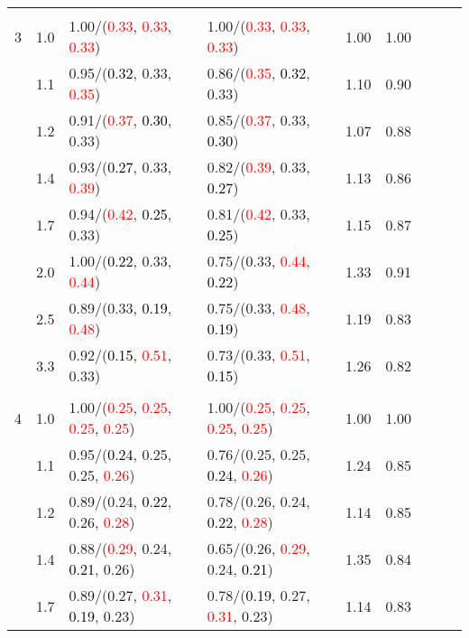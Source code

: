 \documentclass[10pt,a4paper]{report}
\begin{document}
\begin{table}[!htbp]
\begin{center}
{\begin{tabular}{ccllccccc}
			&&&&\\
			3			&1.0&1.00/(\textcolor{red}{0.33}, \textcolor{red}{0.33}, \textcolor{red}{0.33})&1.00/(\textcolor{red}{0.33}, \textcolor{red}{0.33}, \textcolor{red}{0.33})&1.00&1.00\\
			&1.1&0.95/(\textcolor{black}{0.32}, 0.33, \textcolor{red}{0.35})&0.86/(\textcolor{red}{0.35}, \textcolor{black}{0.32}, 0.33)&1.10&0.90\\
			&1.2&0.91/(\textcolor{red}{0.37}, \textcolor{black}{0.30}, 0.33)&0.85/(\textcolor{red}{0.37}, 0.33, \textcolor{black}{0.30})&1.07&0.88\\
			&1.4&0.93/(\textcolor{black}{0.27}, 0.33, \textcolor{red}{0.39})&0.82/(\textcolor{red}{0.39}, 0.33, \textcolor{black}{0.27})&1.13&0.86\\
			&1.7&0.94/(\textcolor{red}{0.42}, \textcolor{black}{0.25}, 0.33)&0.81/(\textcolor{red}{0.42}, 0.33, \textcolor{black}{0.25})&1.15&0.87\\
			&2.0&1.00/(\textcolor{black}{0.22}, 0.33, \textcolor{red}{0.44})&0.75/(0.33, \textcolor{red}{0.44}, \textcolor{black}{0.22})&1.33&0.91\\
			&2.5&0.89/(0.33, \textcolor{black}{0.19}, \textcolor{red}{0.48})&0.75/(0.33, \textcolor{red}{0.48}, \textcolor{black}{0.19})&1.19&0.83\\
			&3.3&0.92/(\textcolor{black}{0.15}, \textcolor{red}{0.51}, 0.33)&0.73/(0.33, \textcolor{red}{0.51}, \textcolor{black}{0.15})&1.26&0.82\\
			&&&&\\
			4			&1.0&1.00/(\textcolor{red}{0.25}, \textcolor{red}{0.25}, \textcolor{red}{0.25}, \textcolor{red}{0.25})&1.00/(\textcolor{red}{0.25}, \textcolor{red}{0.25}, \textcolor{red}{0.25}, \textcolor{red}{0.25})&1.00&1.00\\
			&1.1&0.95/(\textcolor{black}{0.24}, 0.25, 0.25, \textcolor{red}{0.26})&0.76/(0.25, 0.25, \textcolor{black}{0.24}, \textcolor{red}{0.26})&1.24&0.85\\
			&1.2&0.89/(0.24, \textcolor{black}{0.22}, 0.26, \textcolor{red}{0.28})&0.78/(0.26, 0.24, \textcolor{black}{0.22}, \textcolor{red}{0.28})&1.14&0.85\\
			&1.4&0.88/(\textcolor{red}{0.29}, 0.24, \textcolor{black}{0.21}, 0.26)&0.65/(0.26, \textcolor{red}{0.29}, 0.24, \textcolor{black}{0.21})&1.35&0.84\\
			&1.7&0.89/(0.27, \textcolor{red}{0.31}, \textcolor{black}{0.19}, 0.23)&0.78/(\textcolor{black}{0.19}, 0.27, \textcolor{red}{0.31}, 0.23)&1.14&0.83\\

\end{tabular}}
\end{center}
\end{table}
\end{document}
